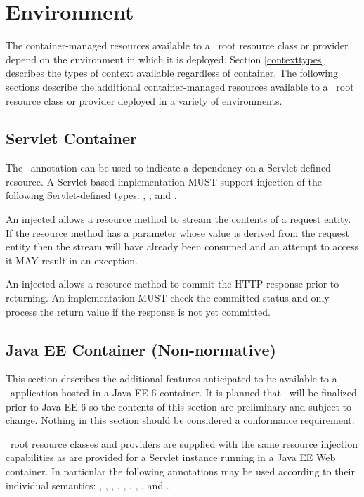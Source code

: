 \chapter{Environment}
\label{environment}

The container-managed resources available to a \jaxrs\ root resource class or provider depend on the environment in which it is deployed. Section \ref{contexttypes} describes the types of context available regardless of container. The following sections describe the additional container-managed resources available to a \jaxrs\ root resource class or provider deployed in a variety of environments.

\section{Servlet Container}

The \Context\ annotation can be used to indicate a dependency on a Servlet-defined resource. A Servlet-based implementation MUST support injection of the following Servlet-defined types: , ,  and .

An injected  allows a resource method to stream the contents of a request entity. If the resource method has a parameter whose value is derived from the request entity then the stream will have already been consumed and an attempt to access it MAY result in an exception.

An injected  allows a resource method to commit the HTTP response prior to returning. An implementation MUST check the committed status and only process the return value if the response is not yet committed.

\section{Java EE Container (Non-normative)}

This section describes the additional features anticipated to be available to a \jaxrs\ application hosted in a Java EE 6 container. It is planned that \jaxrs\ will be finalized prior to Java EE 6 so the contents of this section are preliminary and subject to change. Nothing in this section should be considered a conformance requirement.

\jaxrs\ root resource classes and providers are supplied with the same resource injection capabilities as are provided for a Servlet instance running in a Java EE Web container. In particular the following annotations may be used according to their individual semantics: , , , , , , , ,  and .

